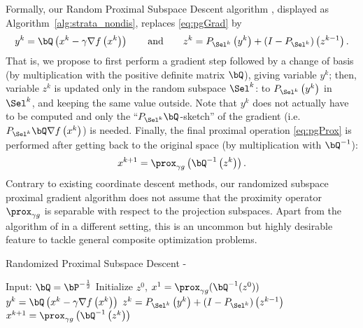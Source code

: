 Formally, our Random Proximal Subspace Descent algorithm \algo, displayed as Algorithm~\ref{alg:strata_nondis}, replaces \eqref{eq:pgGrad} by 
\begin{equation}\label{eq:grad_step}
    y^k = \bQ\left(x^k - \gamma\nabla f\left(x^k\right)\right)\qquad\text{and}\qquad
    z^{k} = P_{\Sel^k} \left(y^k\right) + (I- P_{\Sel^k} ) \left(z^{k-1}\right).
\end{equation}
That is, we propose to first perform a gradient step followed by a change of basis {(by multiplication with the positive definite matrix $\bQ$), giving variable $y^k$}; then, variable $z^k$ is updated only in the random subspace $\Sel^k$: to  $P_{\Sel^k} \left(y^k\right)$ in $\Sel^k$, and keeping the same value outside. Note that $y^k$ does not actually have to be computed and only the ``$P_{\Sel^k}\bQ$-sketch'' of the gradient (i.e.\;$ P_{\Sel^k}\bQ\nabla f\left(x^k\right)$) is needed. Finally, the final proximal operation \eqref{eq:pgProx} is performed {after getting back to the original space (by multiplication with $\bQ^{-1}$)}:
\begin{align}\label{eq:prox_step}
   x^{k+1} = \prox_{\gamma g} \left(\bQ^{-1}\left(z^{k}\right)\right).
\end{align}
Contrary to existing coordinate descent methods, our randomized subspace proximal gradient algorithm does not assume that the proximity operator $\prox_{\gamma g} $ is separable with respect to the projection subspaces. Apart from the algorithm of \cite{hanzely2018sega} in a different setting, this is an uncommon but highly desirable feature to tackle general composite optimization problems.  

\begin{algorithm} %
\caption{Randomized Proximal Subspace Descent - \algo}
\label{alg:strata_nondis} %
\begin{algorithmic}[1] %
    \STATE Input:  $\bQ = \bP^{-\frac12}$
    \STATE Initialize $z^0$, $x^1 = \prox_{\gamma g}(\bQ^{-1}(z^0))$
            \STATE $y^k = \bQ\left(x^k - \gamma\nabla f\left(x^k\right)\right)$
            \STATE $z^{k} = P_{\Sel^k} \left(y^k\right) + (I- P_{\Sel^k} ) \left(z^{k-1}\right)$
            \STATE$x^{k+1} = \prox_{\gamma g} \left(\bQ^{-1}\left(z^{k}\right)\right)$
    \ENDFOR
\end{algorithmic}
\end{algorithm}

